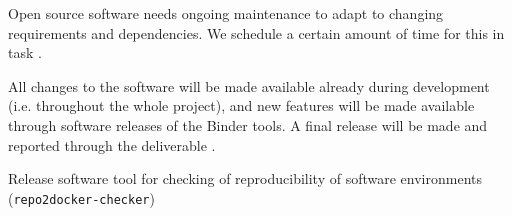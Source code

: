 \begin{workpackage}
\begin{wpdescription}
Open source software needs ongoing maintenance to adapt to changing requirements
and dependencies. We schedule a certain amount of time for this in task
.

All changes to the software will be made available already during development
(i.e. throughout the whole project), and new features will be made available
through software releases of the Binder tools. A final release will be made and
reported through the deliverable .

%

\end{wpdescription}

\begin{tasklist}






\end{tasklist}


\begin{wpdelivs}


  \begin{wpdeliv}[due=12,miles=startup,id=deliv-id-repo2docker-checker-software,dissem=PU,nature=OTHER,lead=SRL]
    {Release software tool for checking of reproducibility of software
      environments (\texttt{repo2docker-checker})}
  \end{wpdeliv}


\end{wpdelivs}
\end{workpackage}
